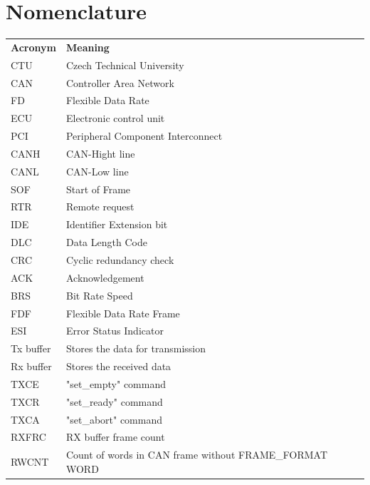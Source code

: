 \documentclass{ctuthesis}
\begin{document}
\maketitle
\chapter*{Nomenclature}

\noindent
\begin{tabularx}{\linewidth}
  { l >{\raggedright\arraybackslash}X }
\bfseries Acronym  & \bfseries Meaning \\\Midrule
CTU & Czech Technical University \\
CAN & Controller Area Network \\
FD & Flexible Data Rate \\
ECU & Electronic control unit \\
PCI & Peripheral Component Interconnect \\
CANH & CAN-Hight line \\
CANL & CAN-Low line \\
SOF & Start of Frame \\
RTR & Remote request \\
IDE & Identifier Extension bit \\
DLC & Data Length Code \\
CRC & Cyclic redundancy check \\
ACK & Acknowledgement \\
BRS & Bit Rate Speed \\
FDF & Flexible Data Rate Frame \\
ESI & Error Status Indicator \\
Tx buffer & Stores the data for transmission \\
Rx buffer & Stores the received data \\
TXCE & "set\_empty" command \\
TXCR & "set\_ready" command \\
TXCA & "set\_abort" command \\
RXFRC & RX buffer frame count \\
RWCNT & Count of words in CAN frame without FRAME\_FORMAT WORD \\
\end{tabularx}
\end{document}
